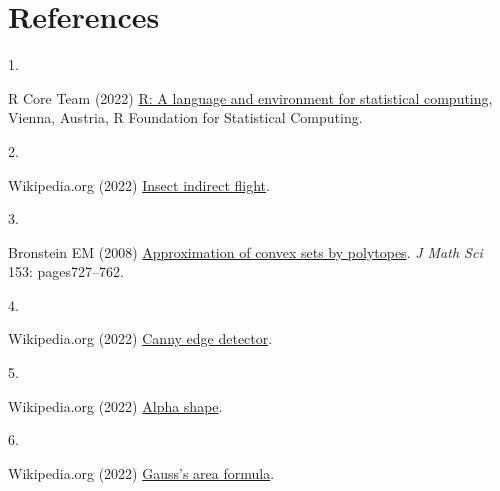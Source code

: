 \documentclass[
]{article}
\newlength{\cslhangindent}
\newlength{\csllabelwidth}
\newlength{\cslentryspacingunit} %
\newenvironment{CSLReferences}[2] %
 {%
  \setlength{\parindent}{0pt}
  \ifodd #1
  \let\oldpar\par
  \def\par{\hangindent=\cslhangindent\oldpar}
  \fi
  \setlength{\parskip}{#2\cslentryspacingunit}
 }%
 {}
\newcommand{\CSLLeftMargin}[1]{\parbox[t]{\csllabelwidth}{#1}}
\newcommand{\CSLRightInline}[1]{\parbox[t]{\linewidth - \csllabelwidth}{#1}\break}
\begin{document}
\hypertarget{references}{%
\section{References}\label{references}}

\hypertarget{refs}{}
\begin{CSLReferences}{0}{0}
\leavevmode{}%
\CSLLeftMargin{1. }
\CSLRightInline{R Core Team (2022) \href{https://www.R-project.org}{R: A
language and environment for statistical computing}, Vienna, Austria, R
Foundation for Statistical Computing.}

\leavevmode{}%
\CSLLeftMargin{2. }
\CSLRightInline{Wikipedia.org (2022)
\href{https://en.wikipedia.org/wiki/Insect_flight\#Indirect_flight}{Insect
indirect flight}.}

\leavevmode{}%
\CSLLeftMargin{3. }
\CSLRightInline{Bronstein EM (2008)
\href{https://doi.org/10.1007/s10958-008-9144-x}{Approximation of convex
sets by polytopes}. \emph{J Math Sci} 153: pages727--762.}

\leavevmode{}%
\CSLLeftMargin{4. }
\CSLRightInline{Wikipedia.org (2022)
\href{https://en.wikipedia.org/wiki/Canny_edge_detector}{Canny edge
detector}.}

\leavevmode{}%
\CSLLeftMargin{5. }
\CSLRightInline{Wikipedia.org (2022)
\href{https://en.wikipedia.org/wiki/Alpha_shape}{Alpha shape}.}

\leavevmode{}%
\CSLLeftMargin{6. }
\CSLRightInline{Wikipedia.org (2022)
\href{https://en.wikipedia.org/wiki/Shoelace_formula}{Gauss's area
formula}.}

\end{CSLReferences}
\end{document}
